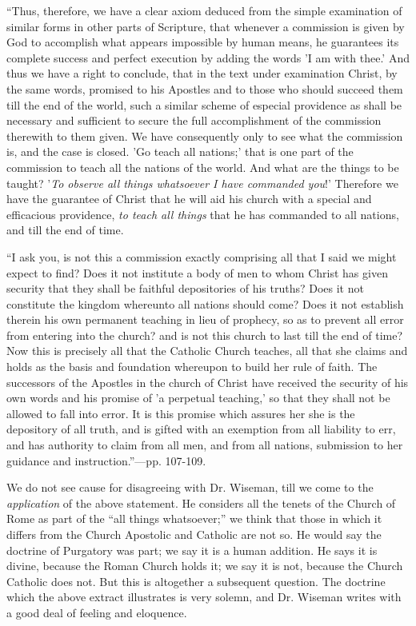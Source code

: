 ``Thus,
therefore, we have a clear axiom deduced from the simple examination of
similar forms in other parts of Scripture, that whenever a commission is
given by God to accomplish what appears impossible by human means, he
guarantees its complete success and perfect execution by adding the
words 'I am with thee.' And thus we have a right to conclude, that
in the text under examination Christ, by the same words, promised to his
Apostles and to those who should succeed them till the end of the world,
such a similar scheme of especial providence as shall be necessary and
sufficient to secure the full accomplishment of the commission therewith
to them given. We have consequently only to see what the commission is,
and the case is closed. 'Go teach all nations;' that is one part of
the commission to teach all the nations of the world. And what are the
things to be taught? '\emph{To observe all things whatsoever I have
commanded you}!' Therefore we have the guarantee of
Christ that he will aid his church with a special and efficacious
providence, \emph{to teach all things} that he has commanded to all
nations, and till the end of time.

``I
ask you, is not this a commission exactly comprising all that I said we
might expect to find? Does it not institute a body of men to whom Christ
has given security that they shall be faithful depositories of his
truths? Does it not constitute the kingdom whereunto all nations should
come? Does it not establish therein his own permanent teaching in lieu
of prophecy, so as to prevent all error from entering into the church?
and is not this church to last till the end of time? Now this is
precisely all that the Catholic Church teaches, all that she claims and
holds as the basis and foundation whereupon to build her rule of faith.
The successors of the Apostles in the church of Christ have received the
security of his own words and his promise of 'a perpetual teaching,'
so that they shall not be allowed to fall into error. It is this promise
which assures her she is the depository of all truth, and is gifted with
an exemption from all liability to err, and has authority to claim from
all men, and from all nations, submission to her guidance and
instruction.''—pp. 107-109.

We do not
see cause for disagreeing with Dr. Wiseman, till we come to the \emph{application}
of the above statement. He considers all the tenets of the Church of
Rome as part of the ``all things whatsoever;'' we think that those in
which it differs from the Church Apostolic and Catholic are not so. He
would say the doctrine of Purgatory was part; we say it is a human
addition. He says it is divine, because the Roman Church holds it; we
say it is not, because the Church Catholic does not. But this is
altogether a subsequent question. The doctrine which the above extract
illustrates is very solemn, and Dr. Wiseman writes with a good deal of
feeling and eloquence.

